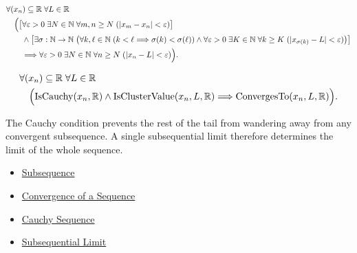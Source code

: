 \begin{remark*}
\[
\begin{aligned}
&\forall (x_n)\subseteq\mathbb{R}\;\forall L\in\mathbb{R}\\
&\quad
\Bigl(
  \bigl[
    \forall \varepsilon>0\;\exists N\in\mathbb{N}\;\forall m,n\ge N
    \;( |x_m-x_n|<\varepsilon )
  \bigr]\\
&\qquad\land
  \bigl[
    \exists \sigma:\mathbb{N}\to\mathbb{N}\;
    \bigl(
      \forall k,\ell\in\mathbb{N}\;(k<\ell\Longrightarrow \sigma(k)<\sigma(\ell))
      \land
      \forall \varepsilon>0\;\exists K\in\mathbb{N}\;\forall k\ge K
      \;( |x_{\sigma(k)}-L|<\varepsilon )
    \bigr)
  \bigr]\\
&\qquad\Longrightarrow
  \forall \varepsilon>0\;\exists N\in\mathbb{N}\;\forall n\ge N
  \;( |x_n-L|<\varepsilon )
\Bigr).
\end{aligned}
\]
\end{remark*}

\begin{remark*}
\[
\begin{aligned}
&\forall (x_n)\subseteq\mathbb{R}\;\forall L\in\mathbb{R}\\
&\quad
\Bigl(
  \operatorname{IsCauchy}(x_n,\mathbb{R})
  \land
  \operatorname{IsClusterValue}(x_n,L,\mathbb{R})
  \Longrightarrow
  \operatorname{ConvergesTo}(x_n,L,\mathbb{R})
\Bigr).
\end{aligned}
\]
\end{remark*}

\begin{remark*}[Interpretation]
The Cauchy condition prevents the rest of the tail from wandering away from
any convergent subsequence. A single subsequential limit therefore determines
the limit of the whole sequence.
\end{remark*}

\begin{dependencies}
\begin{itemize}
  \item \hyperref[def:subsequence-of-sequence]{Subsequence}
  \item \hyperref[def:convergent-sequence]{Convergence of a Sequence}
  \item \hyperref[def:cauchy-sequence]{Cauchy Sequence}
  \item \hyperref[def:subsequential-limit]{Subsequential Limit}
\end{itemize}
\end{dependencies}

